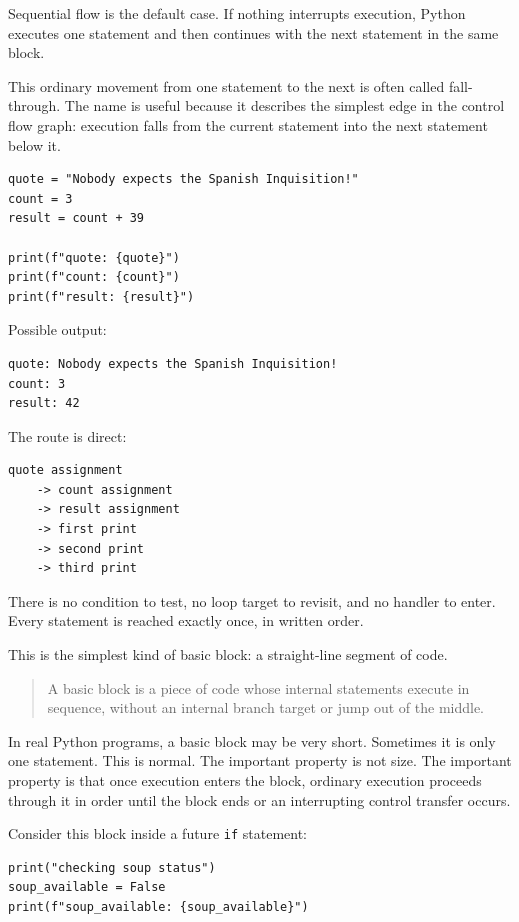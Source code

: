 \documentclass[a4paper,twoside]{report}
\begin{document}
Sequential flow is the default case. If nothing interrupts execution, Python executes one statement and then continues with the next statement in the same block.

This ordinary movement from one statement to the next is often called fall-through. The name is useful because it describes the simplest edge in the control flow graph: execution falls from the current statement into the next statement below it.

\begin{verbatim}
quote = "Nobody expects the Spanish Inquisition!"
count = 3
result = count + 39

print(f"quote: {quote}")
print(f"count: {count}")
print(f"result: {result}")
\end{verbatim}

Possible output:

\begin{verbatim}
quote: Nobody expects the Spanish Inquisition!
count: 3
result: 42
\end{verbatim}

The route is direct:

\begin{verbatim}
quote assignment
    -> count assignment
    -> result assignment
    -> first print
    -> second print
    -> third print
\end{verbatim}

There is no condition to test, no loop target to revisit, and no handler to enter. Every statement is reached exactly once, in written order.

This is the simplest kind of basic block: a straight-line segment of code.

\begin{quote}
A basic block is a piece of code whose internal statements execute in sequence, without an internal branch target or jump out of the middle.
\end{quote}

In real Python programs, a basic block may be very short. Sometimes it is only one statement. This is normal. The important property is not size. The important property is that once execution enters the block, ordinary execution proceeds through it in order until the block ends or an interrupting control transfer occurs.

Consider this block inside a future \texttt{if} statement:

\begin{verbatim}
print("checking soup status")
soup_available = False
print(f"soup_available: {soup_available}")
\end{verbatim}
\end{document}
